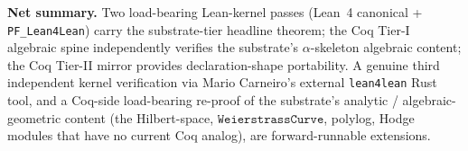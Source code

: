 \documentclass[11pt,a4paper]{amsart}
\theoremstyle{plain}
\theoremstyle{definition}
\begin{document}
\textbf{Net summary.} Two load-bearing Lean-kernel passes (Lean~4 canonical + \texttt{PF\_Lean4Lean}) carry the substrate-tier headline theorem; the Coq Tier-I algebraic spine independently verifies the substrate's $\alpha$-skeleton algebraic content; the Coq Tier-II mirror provides declaration-shape portability. A genuine third independent kernel verification via Mario Carneiro's external \texttt{lean4lean} Rust tool, and a Coq-side load-bearing re-proof of the substrate's analytic / algebraic-geometric content (the Hilbert-space, $\texttt{WeierstrassCurve}$, polylog, Hodge modules that have no current Coq analog), are forward-runnable extensions.
\end{document}
